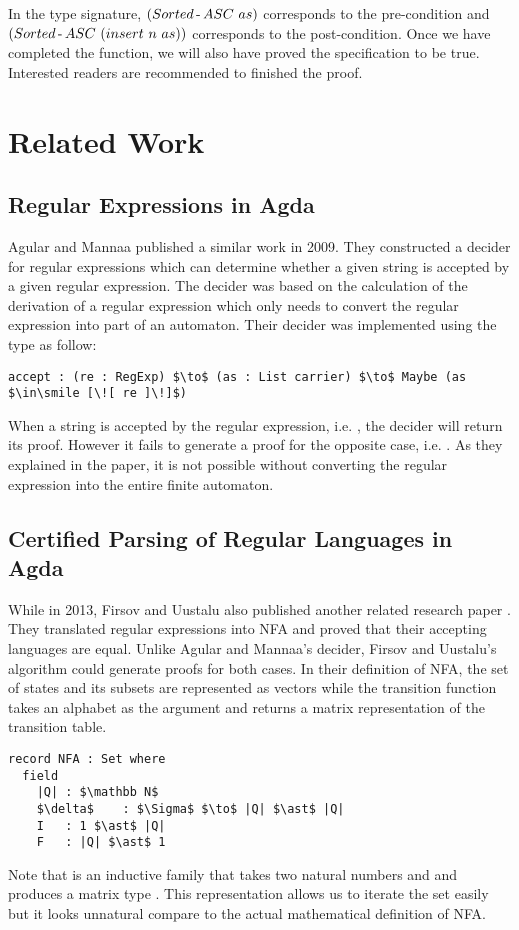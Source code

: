 \par In the type signature, \((Sorted\hyphen ASC\ as)\) corresponds to the pre-condition and
\((Sorted\operatorname{-} ASC\ (insert\ n\ as))\) corresponds to the
post-condition. Once we have completed the
function, we will also have proved the specification to be
true. Interested readers are recommended to finished the proof. 



\newpage
\section{Related Work}

\subsection{Regular Expressions in Agda}
\par Agular and Mannaa published a
similar work \cite{agular2009} in 2009. They constructed a decider for
regular expressions which can determine whether
a given string is accepted by a given regular expression. The decider was based on the calculation of the derivation of a regular
expression which only needs to convert the regular expression into
part of an automaton. Their decider was implemented using the  type as follow:
\begin{lstlisting}[mathescape=true,xleftmargin=.3\textwidth]
accept : (re : RegExp) $\to$ (as : List carrier) $\to$ Maybe (as $\in\smile [\![ re ]\!]$)
\end{lstlisting}
\par When a string is accepted by the regular expression, i.e. , the decider will return its proof. However it fails to generate a
proof for the opposite case, i.e. . As they
explained in the paper, it is not possible without converting the regular expression into
the entire finite automaton. 


\subsection{Certified Parsing of Regular Languages in Agda}
\par While in 2013, Firsov and Uustalu also published another related
research paper \cite{firsov2013}. They translated regular expressions
into NFA and proved that their accepting languages are
equal. Unlike Agular and Mannaa's decider, Firsov and Uustalu's
algorithm could generate proofs for both cases. In their definition of NFA, the set of states
 and its subsets are represented as vectors while the transition function
\mb{\delta} takes an alphabet as the argument and returns a matrix
representation of the transition table. 
\begin{lstlisting}[mathescape=true,xleftmargin=.3\textwidth]
record NFA : Set where
  field
    |Q| : $\mathbb N$
    $\delta$    : $\Sigma$ $\to$ |Q| $\ast$ |Q|
    I   : 1 $\ast$ |Q|
    F   : |Q| $\ast$ 1
\end{lstlisting}

\par Note that \mb{\_\ast\_} is an inductive family that takes two
natural numbers  and  and
produces a matrix type . This representation allows us to
iterate the set easily but it looks unnatural compare to the actual 
mathematical definition of NFA. 